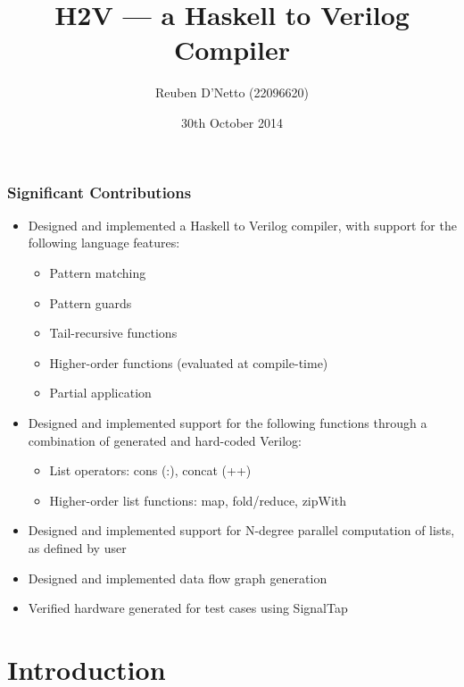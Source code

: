 \documentclass{beamer}
\title{H2V --- a Haskell to Verilog Compiler}
\author{Reuben D'Netto (22096620)}
\date{30th October 2014}
\institute{Supervised by: David Boland}
\begin{document}
\frame{\titlepage}

\begin{frame}
    \frametitle{Significant Contributions}
    \begin{itemize}
        \item Designed and implemented a Haskell to Verilog compiler, with support for the following language features:
            \begin{itemize}
                \item Pattern matching
                \item Pattern guards
                \item Tail-recursive functions
                \item Higher-order functions (evaluated at compile-time)
                \item Partial application
            \end{itemize}
        \item Designed and implemented support for the following functions through a combination of generated and hard-coded Verilog:
            \begin{itemize}
                \item List operators: cons (:), concat (++)
                \item Higher-order list functions: map, fold/reduce, zipWith
            \end{itemize}
        \item Designed and implemented support for N-degree parallel computation of lists, as defined by user
        \item Designed and implemented data flow graph generation
        \item Verified hardware generated for test cases using SignalTap
    \end{itemize}
\end{frame}

{%

}


\section{Introduction}
\end{document}
